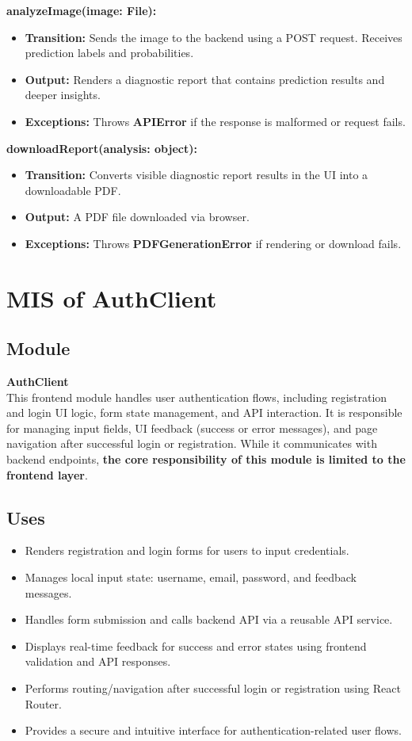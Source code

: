 \documentclass[12pt, titlepage]{article}
\begin{document}
\textbf{analyzeImage(image: File):}
\begin{itemize}
    \item \textbf{Transition:} Sends the image to the backend using a POST request. Receives prediction labels and probabilities.
    \item \textbf{Output:} Renders a diagnostic report that contains prediction results and deeper insights.
    \item \textbf{Exceptions:} Throws \textbf{APIError} if the response is malformed or request fails.
\end{itemize}

\textbf{downloadReport(analysis: object):}
\begin{itemize}
    \item \textbf{Transition:} Converts visible diagnostic report results in the UI into a downloadable PDF.
    \item \textbf{Output:} A PDF file downloaded via browser.
    \item \textbf{Exceptions:} Throws \textbf{PDFGenerationError} if rendering or download fails.
\end{itemize}

\section{MIS of AuthClient}

\subsection{Module}
\textbf{AuthClient} \\
This frontend module handles user authentication flows, including registration and login UI logic, form state management, and API interaction. It is responsible for managing input fields, UI feedback (success or error messages), and page navigation after successful login or registration. While it communicates with backend endpoints, \textbf{the core responsibility of this module is limited to the frontend layer}.

\subsection{Uses}
\begin{itemize}
    \item Renders registration and login forms for users to input credentials.
    \item Manages local input state: username, email, password, and feedback messages.
    \item Handles form submission and calls backend API via a reusable API service.
    \item Displays real-time feedback for success and error states using frontend validation and API responses.
    \item Performs routing/navigation after successful login or registration using React Router.
    \item Provides a secure and intuitive interface for authentication-related user flows.
\end{itemize}
\end{document}
